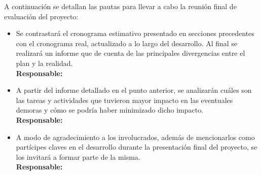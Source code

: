 \documentclass[11pt]{charter}
\begin{document}
A continuación se detallan las pautas para llevar a cabo la reunión final de evaluación del proyecto:

\begin{itemize}
\item Se contrastará el cronograma estimativo presentado en secciones precedentes con el cronograma real, actualizado a lo largo del desarrollo. Al final se realizará un informe que de cuenta de las principales divergencias entre el plan y la realidad. \\
\textbf{Responsable:} \authorname
\item A partir del informe detallado en el punto anterior, se analizarán cuáles son las tareas y actividades que tuvieron mayor impacto en las eventuales demoras y cómo se podría haber minimizado dicho impacto. \\
\textbf{Responsable:} \authorname
\item A modo de agradecimiento a los involucrados, además de mencionarlos como partícipes claves en el desarrollo durante la presentación final del proyecto, se los invitará a formar parte de la misma. \\
\textbf{Responsable:} \authorname
\end{itemize}
\end{document}
